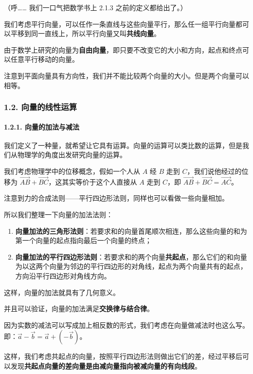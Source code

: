 （呼…… 我们一口气把数学书上 2.1.3 之前的定义都给出了。）

我们考虑平行向量，可以任作一条直线与这些向量平行，那么任一组平行向量都可以平移到同一直线上，所以平行向量又叫\textbf{共线向量}。

由于数学上研究的向量为\textbf{自由向量}，即只要不改变它的大小和方向，起点和终点可以任意平行移动的向量。

注意到平面向量具有方向性，我们并不能比较两个向量的大小。但是两个向量可以相等。

\subsubsection{1.2. 向量的线性运算}

\paragraph{1.2.1. 向量的加法与减法}

我们定义了一种量，就希望让它具有运算。向量的运算可以类比数的运算，但是我们从物理学的角度出发研究向量的运算。

我们考虑物理学中的位移概念，假如一个人从 $A$ 经 $B$ 走到 $C$，我们说他经过的位移为 $\vec{AB}+\vec{BC}$，这其实等价于这个人直接从 $A$ 走到 $C$，即 $\vec{AB}+\vec{BC}=\vec{AC}$。

注意到力的合成法则——平行四边形法则，同样也可以看做一些向量相加。

所以我们整理一下向量的加法法则：

\begin{enumerate}
\item \textbf{向量加法的三角形法则}：若要求和的向量首尾顺次相连，那么这些向量的和为第一个向量的起点指向最后一个向量的终点；
\item \textbf{向量加法的平行四边形法则}：若要求和的两个向量\textbf{共起点}，那么它们的和向量为以这两个向量为邻边的平行四边形的对角线，起点为两个向量共有的起点，方向沿平行四边形对角线方向。
\end{enumerate}

这样，向量的加法就具有了几何意义。

并且可以验证，向量的加法满足\textbf{交换律与结合律}。

因为实数的减法可以写成加上相反数的形式，我们考虑在向量做减法时也这么写。即：$\vec a-\vec b=\vec a+(-\vec b)$。

这样，我们考虑共起点的向量，按照平行四边形法则做出它们的差，经过平移后可以发现\textbf{共起点向量的差向量是由减向量指向被减向量的有向线段}。


